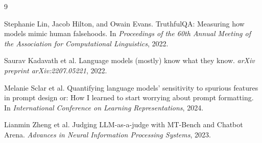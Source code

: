 \documentclass[11pt,a4paper]{article}
\begin{document}
\begin{thebibliography}{9}

Stephanie Lin, Jacob Hilton, and Owain Evans.
\newblock TruthfulQA: Measuring how models mimic human falsehoods.
\newblock In \emph{Proceedings of the 60th Annual Meeting of the Association for Computational Linguistics}, 2022.

Saurav Kadavath et al.
\newblock Language models (mostly) know what they know.
\newblock \emph{arXiv preprint arXiv:2207.05221}, 2022.

Melanie Sclar et al.
\newblock Quantifying language models' sensitivity to spurious features in prompt design or: How I learned to start worrying about prompt formatting.
\newblock In \emph{International Conference on Learning Representations}, 2024.

Lianmin Zheng et al.
\newblock Judging LLM-as-a-judge with MT-Bench and Chatbot Arena.
\newblock \emph{Advances in Neural Information Processing Systems}, 2023.

\end{thebibliography}
\end{document}
